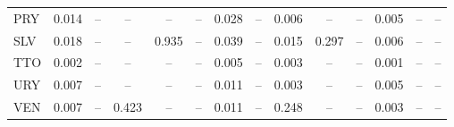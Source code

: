\begin{longtable}{l*{13}{c}}
PRY & 0.014 & -- & -- & -- & -- & 0.028 & -- & 0.006 & -- & -- & 0.005 & -- & -- \\
SLV & 0.018 & -- & -- & 0.935 & -- & 0.039 & -- & 0.015 & 0.297 & -- & 0.006 & -- & -- \\
TTO & 0.002 & -- & -- & -- & -- & 0.005 & -- & 0.003 & -- & -- & 0.001 & -- & -- \\
URY & 0.007 & -- & -- & -- & -- & 0.011 & -- & 0.003 & -- & -- & 0.005 & -- & -- \\
VEN & 0.007 & -- & 0.423 & -- & -- & 0.011 & -- & 0.248 & -- & -- & 0.003 & -- & -- \\
\bottomrule
\end{longtable}
